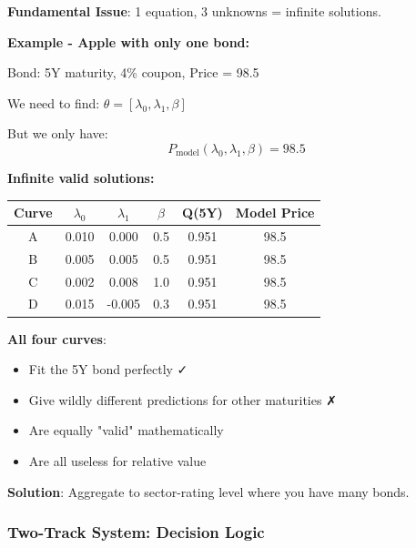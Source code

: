 \documentclass[11pt,a4paper]{article}
\begin{document}
\begin{warnbox}
\textbf{Fundamental Issue}: 1 equation, 3 unknowns = infinite solutions.

\textbf{Example - Apple with only one bond:}

Bond: 5Y maturity, 4\% coupon, Price = 98.5

We need to find: $\theta = [\lambda_0, \lambda_1, \beta]$

But we only have:
$$P_{\text{model}}(\lambda_0, \lambda_1, \beta) = 98.5$$

\textbf{Infinite valid solutions:}

\begin{tabular}{cccccc}
\toprule
Curve & $\lambda_0$ & $\lambda_1$ & $\beta$ & Q(5Y) & Model Price \\
\midrule
A & 0.010 & 0.000 & 0.5 & 0.951 & 98.5 \\
B & 0.005 & 0.005 & 0.5 & 0.951 & 98.5 \\
C & 0.002 & 0.008 & 1.0 & 0.951 & 98.5 \\
D & 0.015 & -0.005 & 0.3 & 0.951 & 98.5 \\
\bottomrule
\end{tabular}

\vspace{0.3cm}

\textbf{All four curves}:
\begin{itemize}
    \item Fit the 5Y bond perfectly ✓
    \item Give wildly different predictions for other maturities ✗
    \item Are equally "valid" mathematically
    \item Are all useless for relative value
\end{itemize}

\textbf{Solution}: Aggregate to sector-rating level where you have many bonds.
\end{warnbox}

\subsubsection{Two-Track System: Decision Logic}
\end{document}
